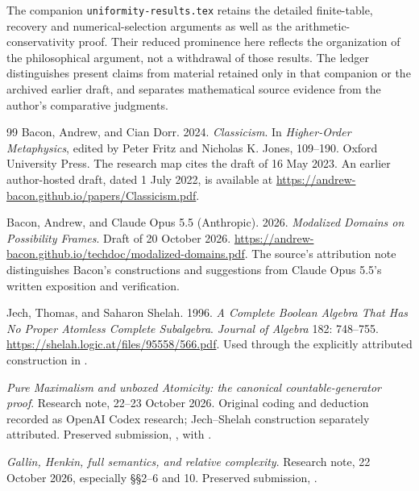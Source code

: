 \documentclass[11pt]{article}
\begin{document}
The companion \texttt{uniformity-results.tex} retains the detailed finite-table, recovery and numerical-selection arguments as well as the arithmetic-conservativity proof. Their reduced prominence here reflects the organization of the philosophical argument, not a withdrawal of those results. The ledger distinguishes present claims from material retained only in that companion or the archived earlier draft, and separates mathematical source evidence from the author's comparative judgments.

\begin{thebibliography}{99}
Bacon, Andrew, and Cian Dorr. 2024.
\emph{Classicism}. In \emph{Higher-Order Metaphysics}, edited by Peter Fritz
and Nicholas K. Jones, 109--190. Oxford University Press.
The research map cites the draft of 16 May 2023.
An earlier author-hosted draft, dated 1 July 2022, is available at
\url{https://andrew-bacon.github.io/papers/Classicism.pdf}.

Bacon, Andrew, and Claude Opus 5.5 (Anthropic). 2026.
\emph{Modalized Domains on Possibility Frames}. Draft of 20 October 2026.
\url{https://andrew-bacon.github.io/techdoc/modalized-domains.pdf}.
The source's attribution note distinguishes Bacon's constructions and suggestions
from Claude Opus 5.5's written exposition and verification.

Jech, Thomas, and Saharon Shelah. 1996.
\emph{A Complete Boolean Algebra That Has No Proper Atomless Complete
Subalgebra}. \emph{Journal of Algebra} 182: 748--755.
\url{https://shelah.logic.at/files/95558/566.pdf}.
Used through the explicitly attributed construction in \citet{maxatomicity}.

\emph{Pure Maximalism and unboxed Atomicity: the canonical countable-generator
proof}. Research note, 22--23 October 2026.
Original coding and deduction recorded as OpenAI Codex research; Jech--Shelah
construction separately attributed. Preserved submission,
,
with .

\emph{Gallin, Henkin, full semantics, and relative complexity}.
Research note, 22 October 2026, especially \S\S2--6 and 10.
Preserved submission,
.


\end{thebibliography}
\end{document}
